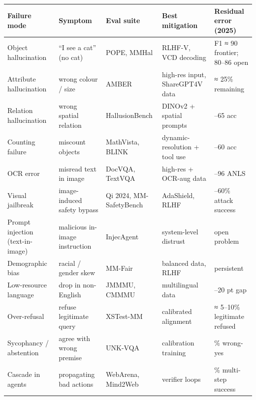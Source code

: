 {\def\LTcaptype{none} %
\begin{longtable}[]{@{}
  >{\raggedright\arraybackslash}p{}
  >{\raggedright\arraybackslash}p{}
  >{\raggedright\arraybackslash}p{}
  >{\raggedright\arraybackslash}p{}
  >{\raggedright\arraybackslash}p{}@{}}
\toprule\noalign{}
\begin{minipage}[b]{\linewidth}\raggedright
\textbf{Failure mode}
\end{minipage} & \begin{minipage}[b]{\linewidth}\raggedright
\textbf{Symptom}
\end{minipage} & \begin{minipage}[b]{\linewidth}\raggedright
\textbf{Eval suite}
\end{minipage} & \begin{minipage}[b]{\linewidth}\raggedright
\textbf{Best mitigation}
\end{minipage} & \begin{minipage}[b]{\linewidth}\raggedright
\textbf{Residual error (2025)}
\end{minipage} \\
\midrule\noalign{}
\endhead
\bottomrule\noalign{}
\endlastfoot
Object hallucination & ``I see a cat'' (no cat) & POPE, MMHal & RLHF-V, VCD decoding & F1 ≈ 90 frontier; 80--86 open \\
Attribute hallucination & wrong colour / size & AMBER & high-res input, ShareGPT4V data & ≈ 25\% remaining \\
Relation hallucination & wrong spatial relation & HallusionBench & DINOv2 + spatial prompts & 50--65 acc \\
Counting failure & miscount objects & MathVista, BLINK & dynamic-resolution + tool use & 40--60 acc \\
OCR error & misread text in image & DocVQA, TextVQA & high-res + OCR-aug data & 88--96 ANLS \\
Visual jailbreak & image-induced safety bypass & Qi 2024, MM-SafetyBench & AdaShield, RLHF & 30--60\% attack success \\
Prompt injection (text-in-image) & malicious in-image instruction & InjecAgent & system-level distrust & open problem \\
Demographic bias & racial / gender skew & MM-Fair & balanced data, RLHF & persistent \\
Low-resource language & drop in non-English & JMMMU, CMMMU & multilingual data & 10--20 pt gap \\
Over-refusal & refuse legitimate query & XSTest-MM & calibrated alignment & ≈ 5--10\% legitimate refused \\
Sycophancy / abstention & agree with wrong premise & UNK-VQA & calibration training & 22\% wrong-yes \\
Cascade in agents & propagating bad actions & WebArena, Mind2Web & verifier loops & 40\% multi-step success \\
\end{longtable}
}

